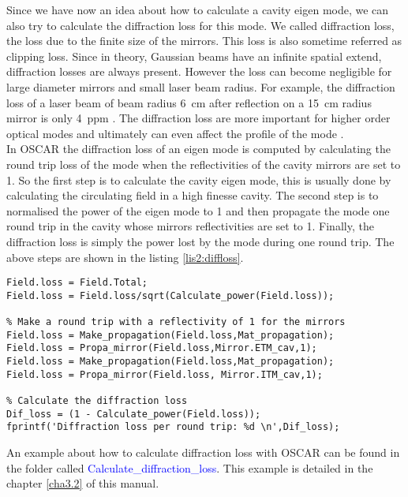 Since we have now an idea about how to calculate a cavity eigen mode, we can also try to calculate the diffraction loss for this mode. We called diffraction loss, the loss due to the finite size of the mirrors. This loss is also sometime referred as clipping loss. Since in theory, Gaussian beams have an infinite spatial extend, diffraction losses are always present. However the loss can become negligible for large diameter mirrors and
small laser beam radius. For example, the diffraction loss of a laser beam of beam radius 6~cm after reflection on a 15~cm radius mirror is only 4~ppm \cite{Siegman}. The diffraction loss are more important for higher order optical modes and ultimately can even affect the profile of the mode \cite{Pab}.\\

In OSCAR the diffraction loss of an eigen mode is computed by calculating the round trip loss of the mode when the reflectivities of the cavity mirrors are set to 1. So the first step is to calculate the cavity eigen mode, this is usually done by calculating the circulating field in a high finesse cavity. The second step is to normalised the power of the eigen mode to 1 and then propagate the mode one round trip in the cavity whose mirrors reflectivities are set to 1. Finally, the diffraction loss is simply the power lost by the mode during one round trip. The above steps are shown in the listing \ref{lis2:diffloss}.

\begin{lstlisting}[float=tp,caption=Piece of code used to calculate the diffraction loss. We suppose that we have already calculate the circulating field \emph{Field.Total}. \label{lis2:diffloss},frame=lines]
% Normalise the circulating field (=the eigen-nmode)
Field.loss = Field.Total;
Field.loss = Field.loss/sqrt(Calculate_power(Field.loss));

% Make a round trip with a reflectivity of 1 for the mirrors
Field.loss = Make_propagation(Field.loss,Mat_propagation);
Field.loss = Propa_mirror(Field.loss,Mirror.ETM_cav,1);
Field.loss = Make_propagation(Field.loss,Mat_propagation);
Field.loss = Propa_mirror(Field.loss, Mirror.ITM_cav,1);

% Calculate the diffraction loss
Dif_loss = (1 - Calculate_power(Field.loss));
fprintf('Diffraction loss per round trip: %d \n',Dif_loss);
\end{lstlisting}

An example about how to calculate diffraction loss with OSCAR can be found in the folder called \textcolor{blue}{Calculate\_diffraction\_loss}. This example is detailed in the chapter \ref{cha3.2} of this manual.

